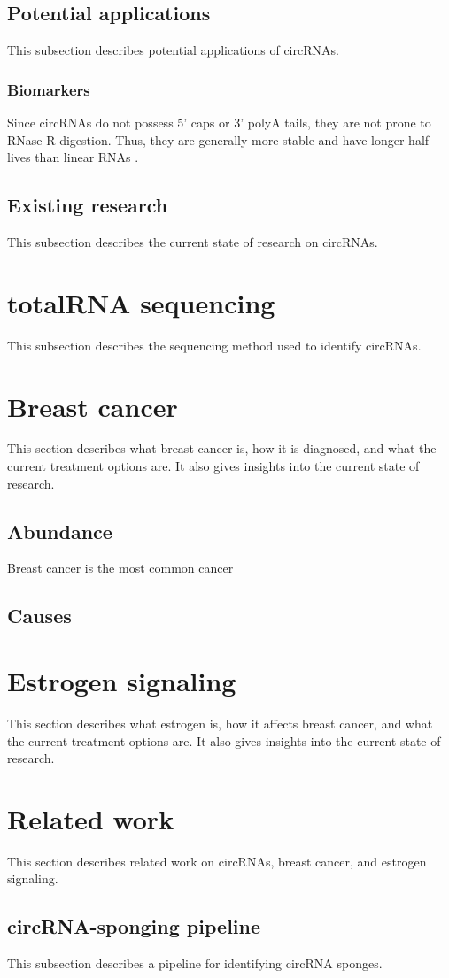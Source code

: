 \subsection{Potential applications}
This subsection describes potential applications of circRNAs.

\subsubsection{Biomarkers}
Since circRNAs do not possess 5' caps or 3' polyA tails, they are not prone to
RNase R digestion. Thus, they are generally more stable and have longer
half-lives than linear RNAs \supercite{kristensen_biogenesis_2019}.

\subsection{Existing research}
This subsection describes the current state of research on circRNAs.

\section{totalRNA sequencing}
This subsection describes the sequencing method used to identify circRNAs.

\lipsum[2]

\section{Breast cancer}
This section describes what breast cancer is, how it is diagnosed, and what the
current treatment options are. It also gives insights into the current state of
research.

\subsection{Abundance}
Breast cancer is the most common cancer

\subsection{Causes}

\section{Estrogen signaling}
This section describes what estrogen is, how it affects breast cancer, and what
the current treatment options are. It also gives insights into the current state
of research.

\lipsum[4]

\section{Related work}
This section describes related work on circRNAs, breast cancer, and estrogen
signaling.

\subsection{circRNA-sponging pipeline}
This subsection describes a pipeline for identifying circRNA sponges.